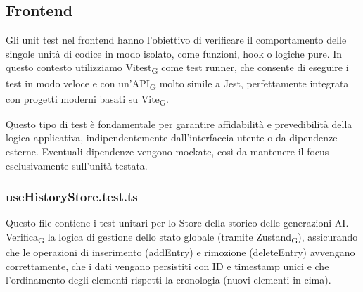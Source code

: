 \documentclass[11pt,a4paper]{article}
\newcommand{\gls}[1]{#1\textsubscript{G}}
\begin{document}
\subsection{Frontend}
Gli unit test nel frontend hanno l’obiettivo di verificare il comportamento delle singole unità di codice in modo isolato, come funzioni, hook o logiche pure. In questo contesto utilizziamo \gls{Vitest} come test runner, che consente di eseguire i test in modo veloce e con un’\gls{API} molto simile a Jest, perfettamente integrata con progetti moderni basati su \gls{Vite}.

Questo tipo di test è fondamentale per garantire affidabilità e prevedibilità della logica applicativa, indipendentemente dall’interfaccia utente o da dipendenze esterne. Eventuali dipendenze vengono mockate, così da mantenere il focus esclusivamente sull’unità testata.

\subsubsection{useHistoryStore.test.ts}
Questo file contiene i test unitari per lo Store della storico delle generazioni AI. \gls{Verifica} la logica di gestione dello stato globale (tramite \gls{Zustand}), assicurando che le operazioni di inserimento (addEntry) e rimozione (deleteEntry) avvengano correttamente, che i dati vengano persistiti con ID e timestamp unici e che l'ordinamento degli elementi rispetti la cronologia (nuovi elementi in cima).
\end{document}
